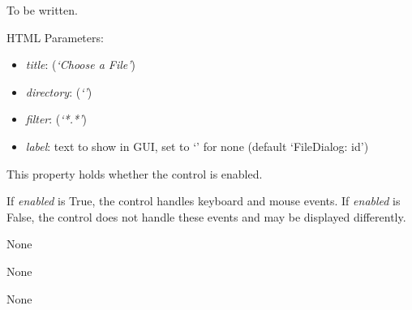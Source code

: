 \documentclass[letterpaper,10pt,english]{sphinxmanual}
\begin{document}
\begin{fulllineitems}
\label{api:controls.FileDialog}
To be written.

HTML Parameters:
\begin{itemize}
\item {} 
\emph{title}: (\emph{`Choose a File'})

\item {} 
\emph{directory}: (\emph{`'})

\item {} 
\emph{filter}: (\emph{`*.*'})

\item {} 
\emph{label}: text to show in GUI, set to `' for none (default `FileDialog: id')

\end{itemize}

\begin{fulllineitems}
\label{api:controls.FileDialog.enabled}
This property holds whether the control is enabled.

If \emph{enabled} is True, the control handles keyboard and mouse events.
If \emph{enabled} is False, the control does not handle these events and may
be displayed differently.

\end{fulllineitems}


\begin{fulllineitems}
\label{api:controls.FileDialog.get_directory}
None

\end{fulllineitems}


\begin{fulllineitems}
\label{api:controls.FileDialog.get_open}
None

\end{fulllineitems}


\begin{fulllineitems}
\label{api:controls.FileDialog.get_save}
None


\end{fulllineitems}
\end{fulllineitems}
\end{document}
